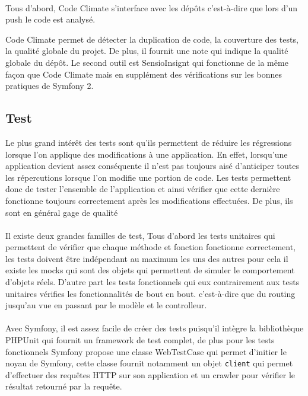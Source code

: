 \paragraph{}
Tous d'abord, Code Climate s'interface avec les dépôts c'est-à-dire que lors d'un push le code est analysé.

Code Climate permet de détecter la duplication de code, la couverture des tests, la qualité globale du projet. De plus, il fournit une note qui indique la qualité globale du dépôt. 
Le second outil est SensioInsignt qui fonctionne de la même façon que Code Climate mais en supplément des vérifications sur les bonnes pratiques de Symfony 2.
\subsection{Test}
Le plus grand intérêt des tests sont qu'ils permettent de réduire les régressions lorsque l'on applique des modifications à une application. En effet, lorsqu'une application devient assez conséquente il n'est pas toujours aisé d'anticiper toutes les répercutions lorsque l'on modifie une portion de code. Les tests permettent donc de tester l'ensemble de l'application et ainsi vérifier que cette dernière fonctionne toujours correctement après les modifications effectuées. 
De plus, ils sont en général gage de qualité
 \paragraph{}
 Il existe deux grandes familles de test, Tous d'abord les tests unitaires qui permettent de vérifier que chaque méthode et fonction fonctionne correctement, les tests doivent être indépendant au maximum les uns des autres pour cela il existe les mocks qui sont des objets qui permettent de simuler le comportement d'objets \og{}réels\fg{}.
 D'autre part les tests fonctionnels qui eux contrairement aux tests unitaires vérifies les fonctionnalités de bout en bout. c'est-à-dire que du routing jusqu'au vue en passant par le modèle et le controlleur.
  \paragraph{}
 Avec Symfony, il est assez facile de créer des tests puisqu'il intègre la bibliothèque PHPUnit qui fournit un framework de test complet, de plus pour les tests fonctionnels Symfony propose une classe WebTestCase qui permet d'initier le noyau de Symfony, cette classe fournit notamment un objet \verb?client? qui permet d'effectuer des requêtes HTTP sur son application et un crawler pour vérifier le résultat retourné par la requête.
